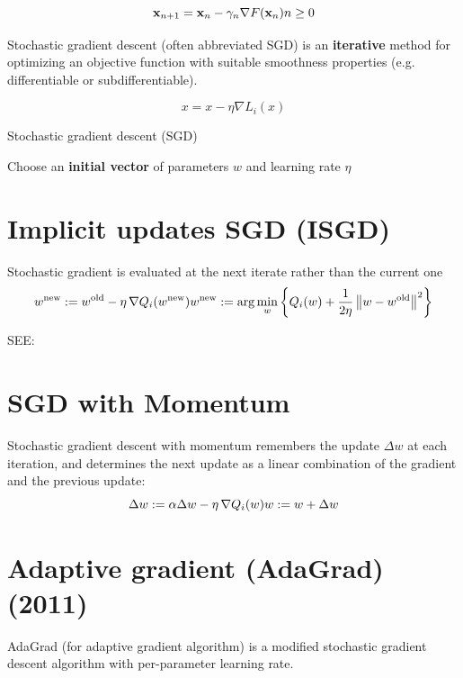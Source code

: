 \[
    \displaystyle \mathbf {x} _{n+1}=\mathbf {x} _{n}-\gamma _{n}\nabla F(\mathbf {x} _{n}) \hfill n\geq 0
\]


Stochastic gradient descent (often abbreviated SGD) is an \textbf{iterative} method for optimizing an objective function with suitable smoothness properties (e.g. differentiable or subdifferentiable).

\[
    \displaystyle x = x - \eta\nabla L_{i}(x)
\]

\begin{algorithm}
    \caption{Stochastic gradient descent (SGD)}
    
    Choose an \textbf{initial vector} of parameters ${\displaystyle w}$ and learning rate ${\displaystyle \eta }$

\end{algorithm}


\section{Implicit updates SGD (ISGD)}\label{Implicit updates SGD (ISGD)}
Stochastic gradient is evaluated at the next iterate rather than the current one
\[
    {\displaystyle w^{\text{new}}:=w^{\text{old}}-\eta \,\nabla Q_{i}(w^{\rm {new}})} 
    \hfill 
    {\displaystyle w^{\text{new}}:=\arg \min _{w}\dCurlyBrac{Q_{i}(w)+{\frac {1}{2\eta }}\dnorm{w-w^{\text{old}}}^{2}}}
\]

SEE: 

\section{SGD with Momentum \cite{wiki-Stochastic_gradient_descent}}\label{SGD with Momentum}
Stochastic gradient descent with momentum remembers the update $\Delta w$ at each iteration, and determines the next update as a linear combination of the gradient and the previous update:
\[
    {\displaystyle \Delta w:=\alpha \Delta w-\eta \,\nabla Q_{i}(w)}
    \hfill
    {\displaystyle w:=w+\Delta w}
\]

\section{Adaptive gradient (AdaGrad) (2011) \cite{wiki-Stochastic_gradient_descent}}\label{Adaptive gradient (AdaGrad)}
AdaGrad (for adaptive gradient algorithm) is a modified stochastic gradient descent algorithm with per-parameter learning rate.

